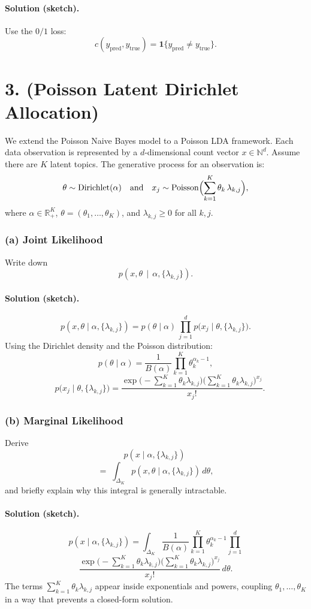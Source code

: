 \documentclass[twocolumn]{article}
\begin{document}
\begin{spacing}{1}
\paragraph{Solution (sketch).}
Use the $0/1$ loss:
\[
c(y_{\mathrm{pred}}, y_{\mathrm{true}}) = \mathbf{1}\{y_{\mathrm{pred}} \neq y_{\mathrm{true}}\}.
\]

\bigskip

\section{3. (Poisson Latent Dirichlet Allocation)}
We extend the Poisson Naive Bayes model to a Poisson LDA framework. Each data observation is represented by a $d$-dimensional count vector $x \in \mathbb{N}^d$. Assume there are $K$ latent topics. The generative process for an observation is:
\[
\theta \sim \mathrm{Dirichlet}(\alpha)
\quad\text{and}\quad
x_j \sim \mathrm{Poisson}\Bigl(\sum_{k=1}^K \theta_k \,\lambda_{k,j}\Bigr),
\]
where $\alpha \in \mathbb{R}_+^K$, $\theta = (\theta_1,\dots,\theta_K)$, and $\lambda_{k,j} \ge 0$ for all $k,j$.

\subsubsection{(a) Joint Likelihood}
Write down
\[
p(x,\theta \,\mid\, \alpha, \{\lambda_{k,j}\}).
\]

\paragraph{Solution (sketch).}
\[
p(x,\theta \mid \alpha,\{\lambda_{k,j}\})
= p(\theta \mid \alpha)\,\prod_{j=1}^d p\bigl(x_j \mid \theta,\{\lambda_{k,j}\}\bigr).
\]
Using the Dirichlet density and the Poisson distribution:
\[
p(\theta \mid \alpha)
= \frac{1}{B(\alpha)} \prod_{k=1}^K \theta_k^{\alpha_k - 1},
\]
\[
\quad
p\bigl(x_j \mid \theta,\{\lambda_{k,j}\}\bigr)
= \frac{\exp\!\bigl(-\sum_{k=1}^K \theta_k\lambda_{k,j}\bigr)\bigl(\sum_{k=1}^K \theta_k\lambda_{k,j}\bigr)^{x_j}}{x_j!}.
\]

\subsubsection{(b) Marginal Likelihood}
Derive
\[
p(x \mid \alpha,\{\lambda_{k,j}\}) \;
\]
\[
=\; \int_{\Delta_K} p(x,\theta \mid \alpha,\{\lambda_{k,j}\})\,d\theta,
\]
and briefly explain why this integral is generally intractable.

\paragraph{Solution (sketch).}
\[
p(x \mid \alpha,\{\lambda_{k,j}\})
= \int_{\Delta_K}
\frac{1}{B(\alpha)} \prod_{k=1}^K \theta_k^{\alpha_k - 1}
\prod_{j=1}^d
\]
\[
\frac{\exp\!\bigl(-\sum_{k=1}^K \theta_k \lambda_{k,j}\bigr)\bigl(\sum_{k=1}^K \theta_k \lambda_{k,j}\bigr)^{x_j}}{x_j!}
\, d\theta.
\]
The terms $\sum_{k=1}^K \theta_k \lambda_{k,j}$ appear inside exponentials and powers, coupling $\theta_1,\dots,\theta_K$ in a way that prevents a closed-form solution.


\end{spacing}
\end{document}
